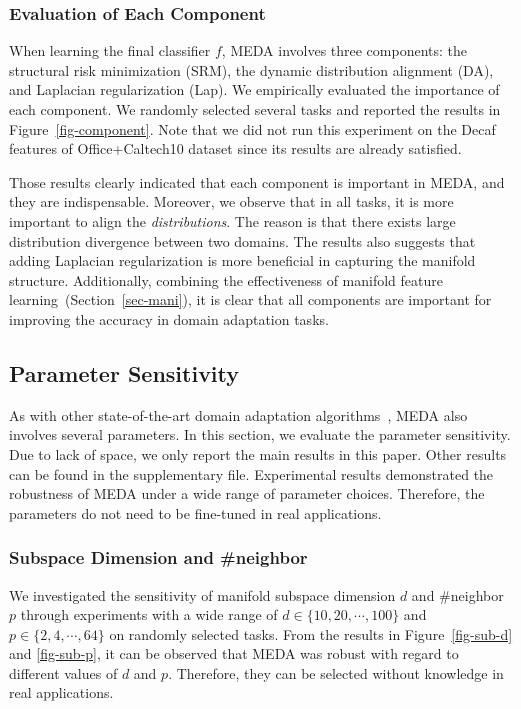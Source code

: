\documentclass[sigconf]{acmart}
\begin{document}
\subsubsection{Evaluation of Each Component} When learning the final classifier $f$, MEDA involves three components: the structural risk minimization (SRM), the dynamic distribution alignment (DA), and Laplacian regularization (Lap). We empirically evaluated the importance of each component. We randomly selected several tasks and reported the results in Figure~\ref{fig-component}. Note that we did not run this experiment on the Decaf features of Office+Caltech10 dataset since its results are already satisfied.

Those results clearly indicated that each component is important in MEDA, and they are indispensable. Moreover, we observe that in all tasks, it is more important to align the \textit{distributions}. The reason is that there exists large distribution divergence between two domains. The results also suggests that adding Laplacian regularization is more beneficial in capturing the manifold structure. Additionally, combining the effectiveness of manifold feature learning~(Section~\ref{sec-mani}), it is clear that all components are important for improving the accuracy in domain adaptation tasks.

\subsection{Parameter Sensitivity}
\label{sec-para}

As with other state-of-the-art domain adaptation algorithms~\cite{zhang2017joint,long2014adaptation,ghifary2017scatter}, MEDA also involves several parameters. In this section, we evaluate the parameter sensitivity. Due to lack of space, we only report the main results in this paper. Other results can be found in the supplementary file. Experimental results demonstrated the robustness of MEDA under a wide range of parameter choices. Therefore, the parameters do not need to be fine-tuned in real applications.

\subsubsection{Subspace Dimension and \#neighbor}

We investigated the sensitivity of manifold subspace dimension $d$ and \#neighbor $p$ through experiments with a wide range of $d \in \{10,20,\cdots,100\}$ and $p \in \{2,4,\cdots,64\}$ on randomly selected tasks. From the results in Figure~\ref{fig-sub-d} and \ref{fig-sub-p}, it can be observed that MEDA was robust with regard to different values of $d$ and $p$. Therefore, they can be selected without knowledge in real applications. 
\end{document}
